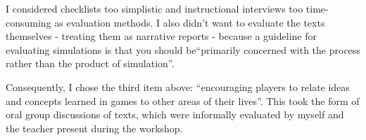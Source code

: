I considered checklists too simplistic and instructional interviews too time-consuming as evaluation methods. I also didn't want to evaluate the texts themselves - treating them as narrative reports - because a guideline for evaluating simulations is that you should be``primarily concerned with the process rather than the product of simulation''\cite{lindabook}.

Consequently, I chose the third item above: ``encouraging players to relate ideas and concepts learned in games to other areas of their lives''. This took the form of oral group discussions of texts, which were informally evaluated by myself and the teacher present during the workshop.
